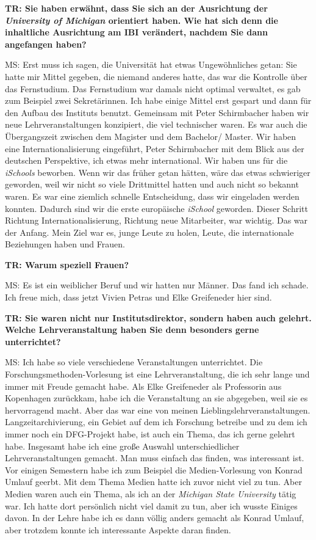 \documentclass[a4paper,
fontsize=11pt,
oneside,
numbers=noperiodatend,
parskip=half-,
bibliography=totoc,
final
]{scrartcl}
\begin{document}
\textbf{TR: Sie haben erwähnt, dass Sie sich an der Ausrichtung der
\emph{University of Michigan} orientiert haben. Wie hat sich denn die
inhaltliche Ausrichtung am IBI verändert, nachdem Sie dann angefangen
haben?}

MS: Erst muss ich sagen, die Universität hat etwas Ungewöhnliches getan:
Sie hatte mir Mittel gegeben, die niemand anderes hatte, das war die
Kontrolle über das Fernstudium. Das Fernstudium war damals nicht optimal
verwaltet, es gab zum Beispiel zwei Sekretärinnen. Ich habe einige
Mittel erst gespart und dann für den Aufbau des Instituts benutzt.
Gemeinsam mit Peter Schirmbacher haben wir neue Lehrveranstaltungen
konzipiert, die viel technischer waren. Es war auch die Übergangszeit
zwischen dem Magister und dem Bachelor/ Master. Wir haben eine
Internationalisierung eingeführt, Peter Schirmbacher mit dem Blick aus
der deutschen Perspektive, ich etwas mehr international. Wir haben uns
für die \emph{iSchools} beworben. Wenn wir das früher getan hätten, wäre
das etwas schwieriger geworden, weil wir nicht so viele Drittmittel
hatten und auch nicht so bekannt waren. Es war eine ziemlich schnelle
Entscheidung, dass wir eingeladen werden konnten. Dadurch sind wir die
erste europäische \emph{iSchool} geworden. Dieser Schritt Richtung
Internationalisierung, Richtung neue Mitarbeiter, war wichtig. Das war
der Anfang. Mein Ziel war es, junge Leute zu holen, Leute, die
internationale Beziehungen haben und Frauen.

\textbf{TR: Warum speziell Frauen?}

MS: Es ist ein weiblicher Beruf und wir hatten nur Männer. Das fand ich
schade. Ich freue mich, dass jetzt Vivien Petras und Elke Greifeneder
hier sind.

\textbf{TR: Sie waren nicht nur Institutsdirektor, sondern haben auch
gelehrt.} \textbf{Welche Lehrveranstaltung haben Sie denn besonders
gerne unterrichtet?}

MS: Ich habe so viele verschiedene Veranstaltungen unterrichtet. Die
Forschungsmethoden-Vorlesung ist eine Lehrveranstaltung, die ich sehr
lange und immer mit Freude gemacht habe. Als Elke Greifeneder als
Professorin aus Kopenhagen zurückkam, habe ich die Veranstaltung an sie
abgegeben, weil sie es hervorragend macht. Aber das war eine von meinen
Lieblingslehrveranstaltungen. Langzeitarchivierung, ein Gebiet auf dem
ich Forschung betreibe und zu dem ich immer noch ein DFG-Projekt habe,
ist auch ein Thema, das ich gerne gelehrt habe. Insgesamt habe ich eine
große Auswahl unterschiedlicher Lehrveranstaltungen gemacht. Man muss
einfach das finden, was interessant ist. Vor einigen Semestern habe ich
zum Beispiel die Medien-Vorlesung von Konrad Umlauf geerbt. Mit dem
Thema Medien hatte ich zuvor nicht viel zu tun. Aber Medien waren auch
ein Thema, als ich an der \emph{Michigan State University} tätig war.
Ich hatte dort persönlich nicht viel damit zu tun, aber ich wusste
Einiges davon. In der Lehre habe ich es dann völlig anders gemacht als
Konrad Umlauf, aber trotzdem konnte ich interessante Aspekte daran
finden.
\end{document}
